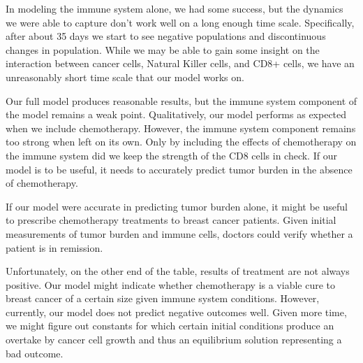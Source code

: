\documentclass[11pt]{amsart}
\begin{document}
In modeling the immune system alone, we had some success, 
but the dynamics we were able to capture don't work well on a long enough time scale. 
Specifically, after about 35 days we start to see negative populations and discontinuous changes 
in population. While we may be able to gain some insight on the interaction between cancer cells, 
Natural Killer cells, and CD8+ cells, we have an unreasonably short time scale that our model works on. 

Our full model produces reasonable results, but the immune system component of the model remains a weak point. Qualitatively, our model performs as expected when we include chemotherapy. However, the immune system component remains too strong when left on its own. Only by including the effects of chemotherapy on the immune system did we keep the strength of the CD8 cells in check. If our model is to be useful, it needs to accurately predict tumor burden in the absence of chemotherapy.

If our model were accurate in predicting tumor burden alone, it might be useful to prescribe chemotherapy treatments to breast cancer patients. Given initial measurements of tumor burden and immune cells, doctors could verify whether a patient is in remission. 

Unfortunately, on the other end of the table, results of treatment are not always positive. Our model might indicate whether chemotherapy is a viable cure to breast cancer of a certain size given immune system conditions. However, currently, our model does not predict negative outcomes well. Given more time, we might figure out constants for which certain initial conditions produce an overtake by cancer cell growth and thus an equilibrium solution representing a bad outcome.

\newpage

\appendix
\end{document}
